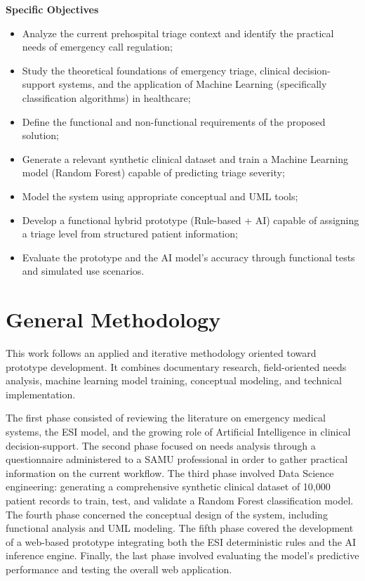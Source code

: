 \documentclass[a4paper,12pt,oneside]{report}
\begin{document}
\noindent\textbf{Specific Objectives}
\begin{itemize}
    \item Analyze the current prehospital triage context and identify the practical needs of emergency call regulation;
    \item Study the theoretical foundations of emergency triage, clinical decision-support systems, and the application of Machine Learning (specifically classification algorithms) in healthcare;
    \item Define the functional and non-functional requirements of the proposed solution;
    \item Generate a relevant synthetic clinical dataset and train a Machine Learning model (Random Forest) capable of predicting triage severity;
    \item Model the system using appropriate conceptual and UML tools;
    \item Develop a functional hybrid prototype (Rule-based + AI) capable of assigning a triage level from structured patient information;
    \item Evaluate the prototype and the AI model's accuracy through functional tests and simulated use scenarios.
\end{itemize}

\section*{General Methodology}

This work follows an applied and iterative methodology oriented toward prototype development. It combines documentary research, field-oriented needs analysis, machine learning model training, conceptual modeling, and technical implementation.

The first phase consisted of reviewing the literature on emergency medical systems, the ESI model, and the growing role of Artificial Intelligence in clinical decision-support. The second phase focused on needs analysis through a questionnaire administered to a SAMU professional in order to gather practical information on the current workflow. The third phase involved Data Science engineering: generating a comprehensive synthetic clinical dataset of 10,000 patient records to train, test, and validate a Random Forest classification model. The fourth phase concerned the conceptual design of the system, including functional analysis and UML modeling. The fifth phase covered the development of a web-based prototype integrating both the ESI deterministic rules and the AI inference engine. Finally, the last phase involved evaluating the model's predictive performance and testing the overall web application.
\end{document}
